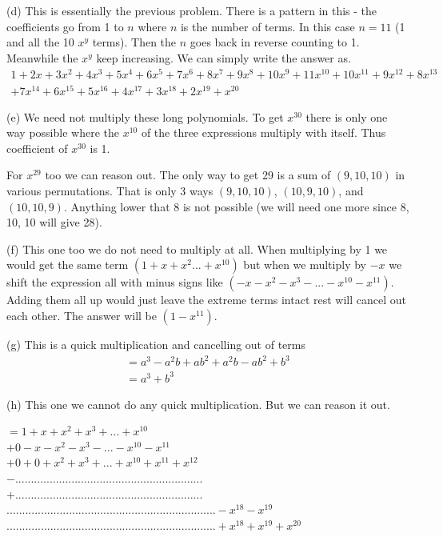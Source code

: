 \documentclass[10pt]{article}
\newcounter{problem}
\begin{document}
 (d)
 This is essentially the previous problem. There is a pattern in this - the coefficients go from 1 to $n$ where $n$ is
 the number of terms. In this case $n = 11$ (1 and all the 10 $x^y$ terms). Then the $n$ goes back in reverse counting
 to 1. Meanwhile the $x^y$ keep increasing. We can simply write the answer as.
 \begin{gather*}
  1 + 2x + 3x^2 + 4x^3 + 5x^4 + 6x^5 + 7x^6 + 8x^7 + 9x^8 + 10x^9 + 11x^{10} + 10x^{11} + 9 x^{12} + 8x^{13}\\
  + 7x^{14} + 6x^{15} + 5x^{16} + 4x^{17} + 3x^{18} + 2x^{19} + x^{20}
 \end{gather*}

 (e) We need not multiply these long polynomials. To get $x^{30}$ there is only one way possible where the $x^{10}$ of the
 three expressions multiply with itself. Thus coefficient of $x^{30}$ is 1.

 For $x^{29}$ too we can reason out. The only way to get 29 is a sum of $(9, 10, 10)$ in various permutations. That is
 only 3 ways $(9, 10, 10)$, $(10, 9, 10)$, and $(10, 10, 9)$. Anything lower that 8 is not possible (we will need
 one more since 8, 10, 10 will give 28).

 (f) This one too we do not need to multiply at all. When multiplying by 1 we would get the same term
 $(1 + x + x^2 ... + x^{10})$ but when we multiply by $-x$ we shift the expression all with minus signs like
 $(- x - x^2 - x^3 - ... - x^{10} - x^{11})$. Adding them all up would just leave the extreme terms intact rest
 will cancel out each other. The answer will be $(1 - x^{11})$.

 (g) This is a quick multiplication and cancelling out of terms
 \begin{gather*}
  = a^3 - a^2b + ab^2 + a^2b - ab^2 + b^3\\
  = a^3 + b^3
 \end{gather*}

 (h) This one we cannot do any quick multiplication. But we can reason it out.

  $= 1 + x + x^2 + x^3 + ... + x^{10}$\\
  $ + 0 - x - x^2 - x^3 - ... - x^{10} - x^{11}$\\
  $ + 0 + 0 + x^2 + x^3 + ... + x^{10} + x^{11} + x^{12}$\\
  $ - ............................................................$\\
  $ + ............................................................$\\
  $................................................................... - x^{18} - x^{19}$\\
  $................................................................... + x^{18} + x^{19} + x^{20}$\\
\end{document}
